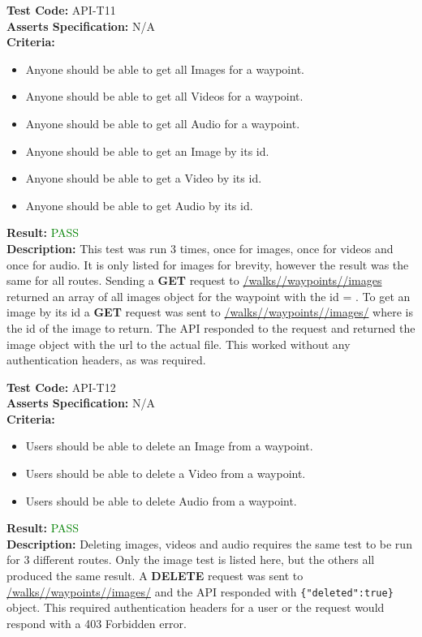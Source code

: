 \documentclass[11pt,a4paper]{report}
\begin{document}
\label{test:API-T11}
\noindent\textbf{Test Code:} API-T11\\
\textbf{Asserts Specification:} N/A \\ 
\textbf{Criteria:} \begin{itemize}
                     \item Anyone should be able to get all Images for a waypoint.
                     \item Anyone should be able to get all Videos for a waypoint.
                     \item Anyone should be able to get all Audio for a waypoint.
                     \item Anyone should be able to get an Image by its id.
                     \item Anyone should be able to get a Video by its id.
                     \item Anyone should be able to get Audio by its id.
                   \end{itemize}  
\textbf{Result:} \textcolor{green}{PASS}\\ 
\textbf{Description:} This test was run 3 times, once for images, once for videos and once for audio. It is only listed for images for brevity, however the result was the same for all routes. Sending a \textbf{GET} request to \url{/walks/}\url{/waypoints/}\url{/images} returned an array of all images object for the waypoint with the id = .
To get an image by its id a \textbf{GET} request was sent to \url{/walks/}\url{/waypoints/}\url{/images/} where  is the id of the image to return. The API responded to the request and returned the image object with the url to the actual file. This worked without any authentication headers, as was required.

\label{test:API-T12}
\noindent\textbf{Test Code:} API-T12\\
\textbf{Asserts Specification:} N/A \\ 
\textbf{Criteria:} \begin{itemize}
                     \item Users should be able to delete an Image from a waypoint.
                     \item Users should be able to delete a Video from a waypoint.
                     \item Users should be able to delete Audio from a waypoint.
                   \end{itemize}  
\textbf{Result:} \textcolor{green}{PASS}\\ 
\textbf{Description:} Deleting images, videos and audio requires the same test to be run for 3 different routes. Only the image test is listed here, but the others all produced the same result. A \textbf{DELETE} request was sent to \url{/walks/}\url{/waypoints/}\url{/images/} and the API responded with \lstinline${"deleted":true}$ object. This required authentication headers for a user or the request would respond with a 403 Forbidden error. 
\end{document}

